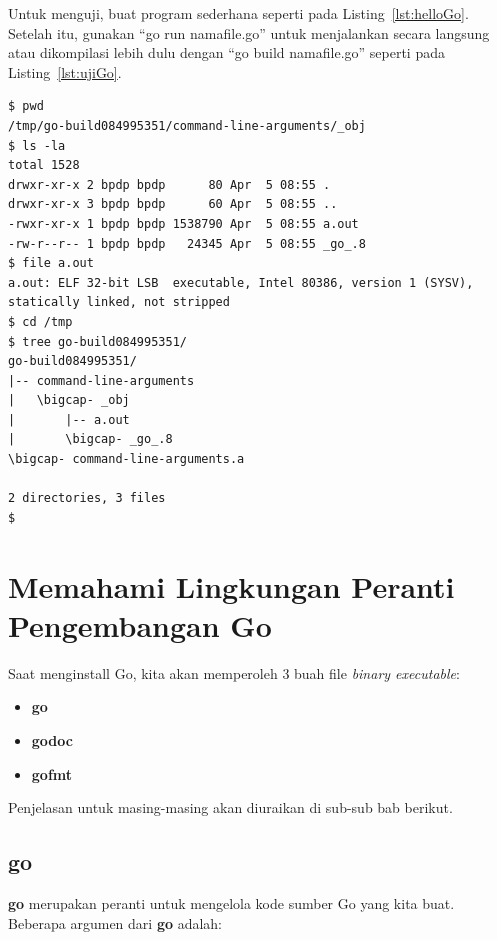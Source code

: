 Untuk menguji, buat program sederhana seperti pada Listing~\ref{lst:helloGo}. Setelah itu, gunakan ``go run namafile.go'' untuk menjalankan secara langsung atau dikompilasi lebih dulu dengan ``go build namafile.go'' seperti pada Listing~\ref{lst:ujiGo}.
	




\begin{mdframed}[style=catatan]
\begin{verbatim}
$ pwd
/tmp/go-build084995351/command-line-arguments/_obj
$ ls -la
total 1528
drwxr-xr-x 2 bpdp bpdp      80 Apr  5 08:55 .
drwxr-xr-x 3 bpdp bpdp      60 Apr  5 08:55 ..
-rwxr-xr-x 1 bpdp bpdp 1538790 Apr  5 08:55 a.out
-rw-r--r-- 1 bpdp bpdp   24345 Apr  5 08:55 _go_.8
$ file a.out 
a.out: ELF 32-bit LSB  executable, Intel 80386, version 1 (SYSV), statically linked, not stripped
$ cd /tmp
$ tree go-build084995351/
go-build084995351/
|-- command-line-arguments
|   \bigcap- _obj
|       |-- a.out
|       \bigcap- _go_.8
\bigcap- command-line-arguments.a

2 directories, 3 files
$
\end{verbatim}
\end{mdframed}

\section{Memahami Lingkungan Peranti Pengembangan Go}

Saat menginstall Go, kita akan memperoleh 3 buah file \textit{binary executable}:
\begin{itemize}
	\item \textbf{go}
	\item \textbf{godoc}
	\item \textbf{gofmt}
\end{itemize}

Penjelasan untuk masing-masing akan diuraikan di sub-sub bab berikut.

\subsection{go}

\textbf{go} merupakan peranti untuk mengelola kode sumber Go yang kita buat. Beberapa argumen dari \textbf{go} adalah:

